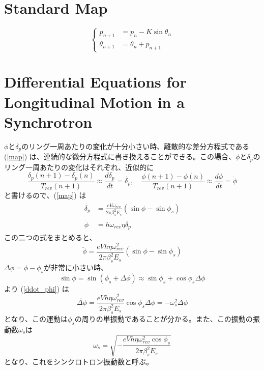 \documentclass[10pt,a4paper]{jlreq}
\begin{document}
\section{Standard Map}

\begin{equation}
  \left\{
    \begin{aligned}
      p_{n+1} &= p_{n} - K \sin\theta_n \\
      \theta_{n+1} &= \theta_n + p_{n+1}
    \end{aligned}
  \right.
\end{equation}

\section{Differential Equations for Longitudinal Motion in a Synchrotron}
$\phi$と$\delta_p$のリング一周あたりの変化が十分小さい時、離散的な差分方程式である (\ref{map}) は、連続的な微分方程式に書き換えることができる。この場合、$\phi$と$\delta_p$のリング一周あたりの変化はそれぞれ、近似的に
%
\begin{equation}
  \frac{\delta_p(n+1)-\delta_p(n)}{T_{rev}(n+1)} \approx \frac{d\delta_p}{dt}=\dot{\delta_p},\quad 
  \frac{\phi(n+1)-\phi(n)}{T_{rev}(n+1)} \approx \frac{d\phi}{dt}= \dot{\phi}
\end{equation}
%
と書けるので、(\ref{map}) は
%
\begin{align}
    \begin{split}
      \dot{\delta_p} &= \frac{e V \omega_{rev}}{2\pi \beta_s^2 E_s}(\sin\phi - \sin\phi_s) \\
      \dot{\phi} &= h \omega_{rev} \eta \delta_p
    \end{split}
\end{align}
%
この二つの式をまとめると、
%
\begin{equation}
  \ddot{\phi} = \frac{e V h \eta \omega_{rev}^2}{2\pi\beta_s^2 E_s}(\sin\phi-\sin\phi_s)
  \label{ddot_phi}
\end{equation}
%
$\Delta\phi = \phi - \phi_s$が非常に小さい時、
%
\begin{equation}
  \sin\phi = \sin(\phi_s+\Delta\phi) \approx \sin\phi_s + \cos\phi_s \Delta\phi
\end{equation}
%
より (\ref{ddot_phi}) は
%
\begin{equation}
  \ddot{\Delta\phi} = \frac{e V h \eta \omega_{rev}^2}{2\pi \beta_s^2 E_s} \cos\phi_s \Delta\phi = - \omega_s^2 \Delta\phi
\end{equation}
%
となり、この運動は$\phi_s$の周りの単振動であることが分かる。また、この振動の振動数$\omega_s$は
%
\begin{equation}
  \omega_s = \sqrt{-\frac{e V h \eta \omega_{rev}^2 \cos\phi_s}{2\pi \beta_s^2 E_s}}
\end{equation}
%
となり、これをシンクロトロン振動数と呼ぶ。
%
\vspace{\baselineskip}
\end{document}

